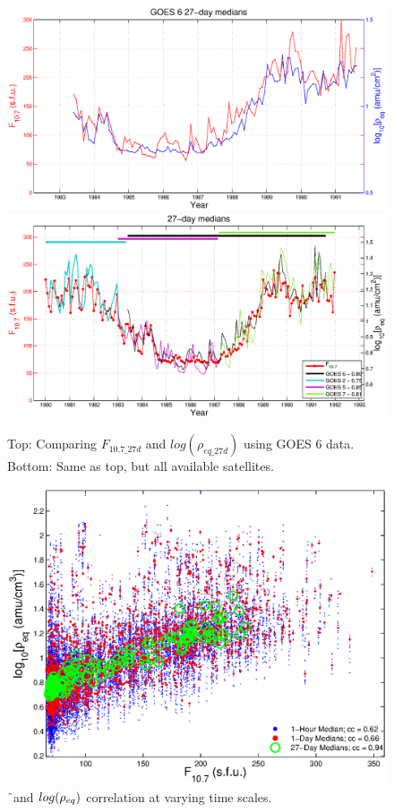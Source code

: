 \begin{figure}[htp!]
	\centering
	\includegraphics[width=0.95\linewidth]{Figures/F107MD27d-GOES6}
	\includegraphics[width=0.95\linewidth]{Figures/F107MD27d-all}
	\caption{Top: Comparing $F_{10.7\_27d}$ and $log(\rho_{eq\_27d})$ using GOES 6 data. Bottom: Same as top, but all available satellites.}
	\label{fig:F107rhoeq27dcomparison}
\end{figure}

\begin{figure}[htp!]
	\centering
	\includegraphics[width=0.7\linewidth]{Figures/ccplot-GOES6}
	\caption{\f\ and $log(\rho_{eq})$ correlation at varying time scales.}
	\label{fig:ccplot}
\end{figure}


